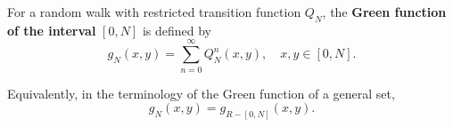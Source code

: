 For a random walk with restricted transition function $Q_N$, the \textbf{Green function of the interval} $[0,N]$ is defined by
$$g_N(x,y) = \sum_{n=0}^{\infty} Q_N^n(x,y), \quad x,y \in [0,N].$$

Equivalently, in the terminology of the Green function of a general set,
$$g_N(x,y) = g_{R-[0,N]}(x,y).$$

